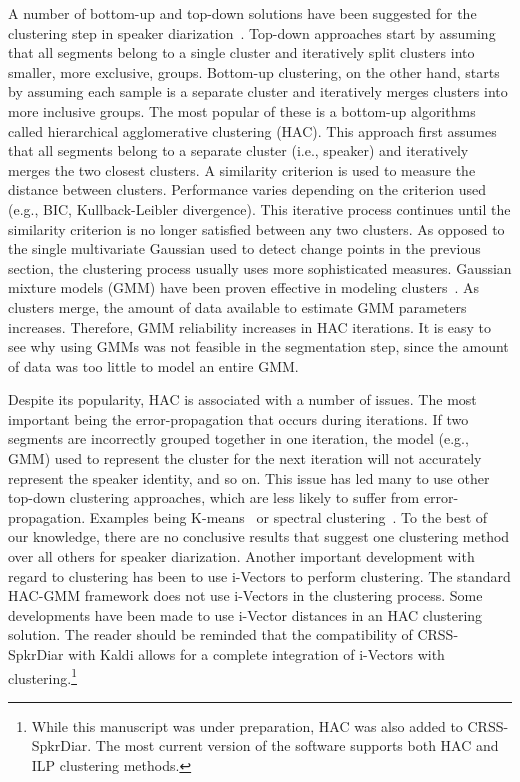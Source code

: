 A number of bottom-up and top-down solutions have been suggested for the clustering step in speaker diarization~\cite{tranterreynolds2006drzoverview,anguera2012DRZreview}. 
Top-down approaches start by assuming that all segments belong to a single cluster and iteratively split clusters into smaller, more exclusive, groups. 
Bottom-up clustering, on the other hand, starts by assuming each sample is a separate cluster and iteratively merges clusters into more inclusive groups. 
The most popular of these is a bottom-up algorithms called hierarchical agglomerative clustering (HAC). 
This approach first assumes that all segments belong to a separate cluster (i.e., speaker) and iteratively merges the two closest clusters. 
A similarity criterion is used to measure the distance between clusters. 
Performance varies depending on the criterion used (e.g., BIC, Kullback-Leibler divergence). 
This iterative process continues until the similarity criterion is no longer satisfied between any two clusters. 
As opposed to the single multivariate Gaussian used to detect change points in the previous section, the clustering process usually uses more sophisticated measures. 
Gaussian mixture models (GMM) have been proven effective in modeling clusters~\cite{zelenak2010albayzin}. 
As clusters merge, the amount of data available to estimate GMM parameters increases. 
Therefore, GMM reliability increases in HAC iterations. 
It is easy to see why using GMMs was not feasible in the segmentation step, since the amount of data was too little to model an entire GMM. 

Despite its popularity, HAC is associated with a number of issues. 
The most important being the error-propagation that occurs during iterations. 
If two segments are incorrectly grouped together in one iteration, the model (e.g., GMM) used to represent the cluster for the next iteration will not accurately represent the speaker identity, and so on. 
This issue has led many to use other top-down clustering approaches, which are less likely to suffer from error-propagation. Examples being K-means~\cite{shum2011exploiting} or spectral clustering~\cite{shum2012spectralclustering, ning2006spectral}. 
To the best of our knowledge, there are no conclusive results that suggest one clustering method over all others for speaker diarization. 
Another important development with regard to clustering has been to use i-Vectors to perform clustering. 
The standard HAC-GMM framework does not use i-Vectors in the clustering process. 
Some developments have been made to use i-Vector distances in an HAC clustering solution. 
The reader should be reminded that the compatibility of CRSS-SpkrDiar with Kaldi allows for a complete integration of i-Vectors with clustering.\footnote{While this manuscript was under preparation, HAC was also added to CRSS-SpkrDiar. The most current version of the software supports both HAC and ILP clustering methods.} 

